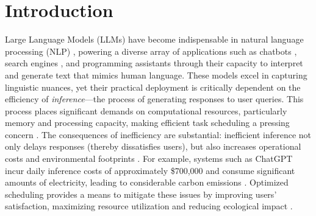 \section{Introduction}

Large Language Models (LLMs) have become indispensable in natural language processing (NLP) \citep{devlin2019bert,brown2020language,kaplan2020scaling,ouyang2022training,wei2022emergent,wei2022chain,touvron2023llama,openai2024gpt4technicalreport}, powering a diverse array of applications such as chatbots \citep{anthropic2023claude,bai2023qwen,openai2024gpt4technicalreport,deepseekai2025deepseekr1incentivizingreasoningcapability}, search engines \citep{google2023bard,microsoft2023bing}, and programming assistants \citep{copilot,claude_3_7} through their capacity to interpret and generate text that mimics human language. These models excel in capturing linguistic nuances, yet their practical deployment is critically dependent on the efficiency of \textit{inference}---the process of generating responses to user queries. This process places significant demands on computational resources, particularly memory and processing capacity, making efficient task scheduling a pressing concern \citep{garcia2019estimation}. The consequences of inefficiency are substantial: inefficient inference not only delays responses (thereby dissatisfies users), but also increases operational costs and environmental footprints \citep{strubell2019energy,desislavov2021compute}. For example, systems such as ChatGPT incur daily inference costs of approximately \$700,000 and consume significant amounts of electricity, leading to considerable carbon emissions \citep{patel2023peeling,patterson2021carbon}. Optimized scheduling provides a means to mitigate these issues by improving users' satisfaction, maximizing resource utilization and reducing ecological impact \citep{wu2022sustainable}.

